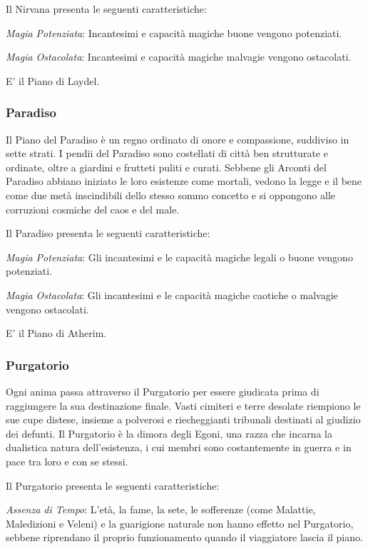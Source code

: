 \documentclass[a4paper,twoside,openany]{book}
\begin{document}
\begin{multicols}{2}
Il Nirvana presenta le seguenti caratteristiche:

\emph{Magia Potenziata}: Incantesimi e capacità magiche buone vengono potenziati.

\emph{Magia Ostacolata}: Incantesimi e capacità magiche malvagie vengono ostacolati.

E' il Piano di Laydel.

\subsubsection{Paradiso}\label{pianoparadiso}
Il Piano del Paradiso è un regno ordinato di onore e compassione, suddiviso in sette strati. I pendii del Paradiso sono costellati di città ben strutturate e ordinate, oltre a giardini e frutteti puliti e curati. Sebbene gli Arconti del Paradiso abbiano iniziato le loro esistenze come mortali, vedono la legge e il bene come due metà inscindibili dello stesso sommo concetto e si oppongono alle corruzioni cosmiche del caos e del male.

Il Paradiso presenta le seguenti caratteristiche:

\emph{Magia Potenziata}: Gli incantesimi e le capacità magiche legali o buone vengono potenziati.

\emph{Magia Ostacolata}: Gli incantesimi e le capacità magiche caotiche o malvagie vengono ostacolati.

E' il Piano di Atherim.

\subsubsection{Purgatorio}\label{pianopurgatorio}
Ogni anima passa attraverso il Purgatorio per essere giudicata prima di raggiungere la sua destinazione finale. Vasti cimiteri e terre desolate riempiono le sue cupe distese, insieme a polverosi e riecheggianti tribunali destinati al giudizio dei defunti. Il Purgatorio è la dimora degli Egoni, una razza che incarna la dualistica natura dell'esistenza, i cui membri sono costantemente in guerra e in pace tra loro e con se stessi.

Il Purgatorio presenta le seguenti caratteristiche:

\emph{Assenza di Tempo}: L'età, la fame, la sete, le sofferenze (come Malattie, Maledizioni e Veleni) e la guarigione naturale non hanno effetto nel Purgatorio, sebbene riprendano il proprio funzionamento quando il viaggiatore lascia il piano.


\end{multicols}
\end{document}

